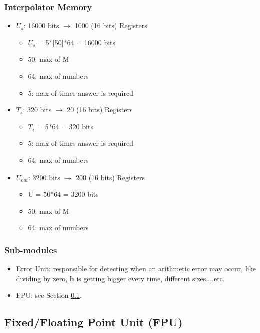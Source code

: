 \documentclass[12pt]{report}
\begin{document}
\subsubsection{Interpolator Memory}
\begin{itemize}
    \item $U_s$: 16000 bits $\rightarrow$ 1000 (16 bits) Registers
    \begin{itemize}
        \item $U_s$ = 5*[50]*64 = 16000 bits
        \item 50: max of M
        \item 64: max of numbers
        \item 5: max of times answer is required
    \end{itemize}
    \item $T_s$: 320 bits $\rightarrow$ 20 (16 bits) Registers
    \begin{itemize}
        \item $T_s$ = 5*64 = 320 bits
        \item 5: max of times answer is required
        \item 64: max of numbers
    \end{itemize}
    \item $U_{out}$: 3200 bits $\rightarrow$ 200 (16 bits) Registers
    \begin{itemize}
        \item U = 50*64 = 3200 bits
        \item 50: max of M
        \item 64: max of numbers
    \end{itemize}
\end{itemize}

\subsubsection{Sub-modules}
\begin{itemize}
    \item {Error Unit}: responsible for detecting when an arithmetic error may occur, like dividing by zero, \textbf{h} is getting bigger every time, different sizes....etc.
    \item {FPU}: see Section \ref{sec:fpu}.
\end{itemize}

\subsection{Fixed/Floating Point Unit (FPU)}
\label{sec:fpu}
\end{document}
